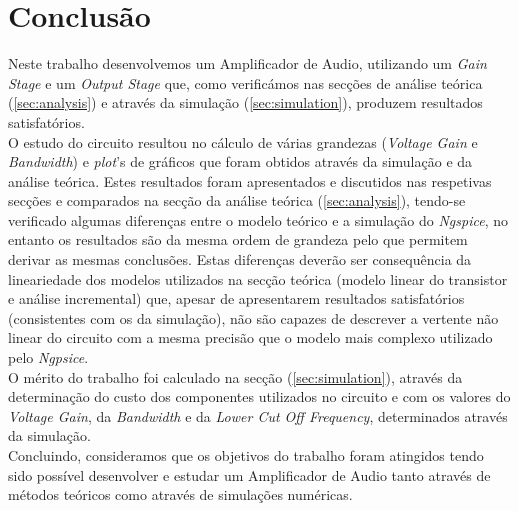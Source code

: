 \section{Conclusão}
\label{sec:conclusion}

Neste trabalho desenvolvemos um Amplificador de Audio, utilizando um \emph{Gain Stage} e um \emph{Output Stage} que, como verificámos
nas secções de análise teórica (\ref{sec:analysis}) e através da simulação (\ref{sec:simulation}), produzem resultados satisfatórios.
\\
O estudo do circuito resultou no cálculo de várias grandezas (\emph{Voltage Gain} e \emph{Bandwidth}) e \emph{plot}'s de gráficos que
foram obtidos através da simulação e da análise teórica. Estes resultados foram apresentados e discutidos nas respetivas secções e
comparados na secção da análise teórica (\ref{sec:analysis}), tendo-se verificado algumas diferenças entre o modelo teórico e a simulação
do \emph{Ngspice}, no entanto os resultados são da mesma ordem de grandeza pelo que permitem derivar as mesmas conclusões.
Estas diferenças deverão ser consequência da lineariedade dos modelos utilizados na secção teórica (modelo linear do transistor 
e análise incremental) que, apesar de apresentarem resultados satisfatórios (consistentes com os da simulação), 
não são capazes de descrever a vertente não linear do circuito com a mesma precisão que o modelo mais complexo utilizado pelo \emph{Ngpsice}.
\\
O mérito do trabalho foi calculado na secção (\ref{sec:simulation}), através da determinação do custo dos componentes utilizados no circuito
e com os valores do \emph{Voltage Gain}, da \emph{Bandwidth} e da \emph{Lower Cut Off Frequency}, determinados através da simulação.
\\
Concluindo, consideramos que os objetivos do trabalho foram atingidos tendo sido possível desenvolver e estudar um Amplificador de Audio
tanto através de métodos teóricos como através de simulações numéricas.